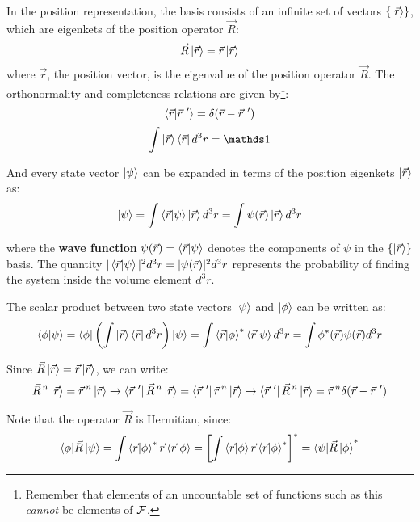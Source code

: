 In the position representation, the basis consists of an infinite set of vectors $\{\ket{\vec{r}}\}$, which are eigenkets of the position operator $\vec{R}$:
\begin{equation}
    \vec{R}\ket{\vec{r}} = \vec{r}\ket{\vec{r}}
\end{equation}
where $\vec{r}$, the position vector, is the eigenvalue of the position operator $\vec{R}$. The orthonormality and completeness relations are given by\footnote{Remember that elements of an uncountable set of functions such as this \textit{cannot} be elements of $\mathcal{F}$.}:
\begin{equation}
    \braket{\vec{r}|\vec{r}\ '} = \delta(\vec{r} - \vec{r}\ ')
\end{equation} 
\begin{equation}
    \int \ket{\vec{r}}\bra{\vec{r}} d^3r = \Imat
\end{equation}

And every state vector $\ket{\psi}$ can be expanded in terms of the position eigenkets $\ket{\vec{r}}$ as:
\begin{equation}
    \ket{\psi} = \int \braket{\vec{r}|\psi} \ket{\vec{r}} d^3 r = \int \psi(\vec{r}) \ket{\vec{r}} d^3 r
\end{equation}

where the \textbf{wave function} $\psi(\vec{r}) = \braket{\vec{r}|\psi}$ denotes the components of $\psi$ in the $\{\ket{\vec{r}}\}$ basis. The quantity $|\braket{\vec{r}|\psi}|^2d^3 r = |\psi(\vec{r})|^2d^3r$ represents the probability of finding the system inside the volume element $d^3r$.

The scalar product between two state vectors $\ket{\psi}$ and $\ket{\phi}$ can be written as:
\begin{equation}
    \braket{\phi|\psi} = \bra{\phi}\left(\int \ket{\vec{r}}\bra{\vec{r}}d^3r\right)\ket{\psi} = \int \braket{\vec{r}|\phi}^*\braket{\vec{r}|\psi} d^3r = \int \phi^*(\vec{r})\psi(\vec{r}) d^3r
\end{equation}

Since $\vec{R}\ket{\vec{r}} = \vec{r}\ket{\vec{r}}$, we can write:
\begin{equation}
    \vec{R}^{\, n}\ket{\vec{r}} = \vec{r}\, ^n\ket{\vec{r}} \to \bra{\vec{r}\ '}\vec{R}^{\, n}\ket{\vec{r}} = \bra{\vec{r}\ '}\vec{r}\, ^n\ket{\vec{r}} \to \bra{\vec{r}\ '}\vec{R}^{\, n}\ket{\vec{r}} = \vec{r}\, ^n\delta(\vec{r} - \vec{r}\ ')
\end{equation}

Note that the operator $\vec{R}$ is Hermitian, since:
\begin{equation}
    \braket{\phi|\vec{R}\,|\psi} = \int \braket{\vec{r}|\phi}^*\vec{r}\braket{\vec{r}|\phi} = \left[\int \braket{\vec{r}|\phi}\vec{r}\braket{\vec{r}|\phi}^*\right]^* = \braket{\psi|\vec{R}\,|\phi}^*
\end{equation}


